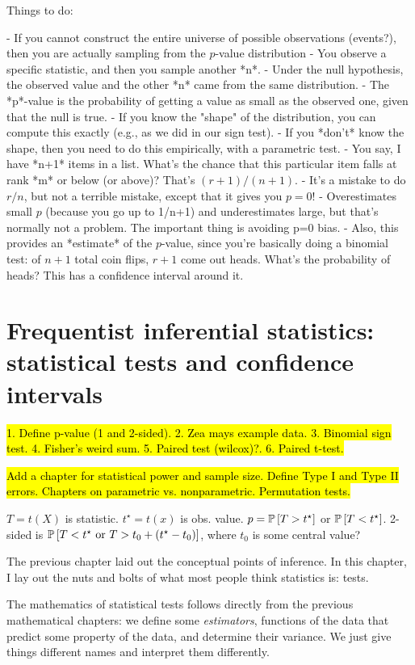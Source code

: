 
Things to do:

- If you cannot construct the entire universe of possible observations (events?), then you are actually sampling from the $p$-value distribution
- You observe a specific statistic, and then you sample another *n*.
- Under the null hypothesis, the observed value and the other *n* came from the same distribution.
- The *p*-value is the probability of getting a value as small as the observed one, given that the null is true.
- If you know the "shape" of the distribution, you can compute this exactly (e.g., as we did in our sign test).
- If you *don't* know the shape, then you need to do this empirically, with a parametric test.
- You say, I have *n+1* items in a list. What's the chance that this particular item falls at rank *m* or below (or above)? That's $(r+1)/(n+1)$.
- It's a mistake to do $r/n$, but not a terrible mistake, except that it gives you $p=0$!
- Overestimates small $p$ (because you go up to 1/n+1) and underestimates large, but that's normally not a problem. The important thing is avoiding p=0 bias.
- Also, this provides an *estimate* of the $p$-value, since you're basically doing a binomial test: of $n+1$ total coin flips, $r+1$ come out heads. What's the probability of heads? This has a confidence interval around it.

\chapter{Frequentist inferential statistics: statistical tests and confidence intervals}

\hl{1. Define p-value (1 and 2-sided). 2. Zea mays example data. 3. Binomial sign test. 4. Fisher's weird sum. 5. Paired test (wilcox)?. 6. Paired t-test.}

\hl{Add a chapter for statistical power and sample size. Define Type I and Type II errors. Chapters on parametric vs. nonparametric. Permutation tests.}

$T=t(X)$ is statistic. $t^\star = t(x)$ is obs. value. $p=\mathbb{P}\left[{T>t^\star}\right]$ or $\mathbb{P}\left[{T<t^\star}\right]$. 2-sided is $\mathbb{P}\left[{T<t^\star \text{ or } T > t_0 + (t^\star-t_0)}\right]$, where $t_0$ is some central value?

The previous chapter laid out the conceptual points of inference. In this chapter, I lay out the nuts and bolts of what most people think statistics is: tests.

The mathematics of statistical tests follows directly from the previous mathematical chapters: we define some \emph{estimators}, functions of the data that predict some property of the data, and determine their variance. We just give things different names and interpret them differently.

